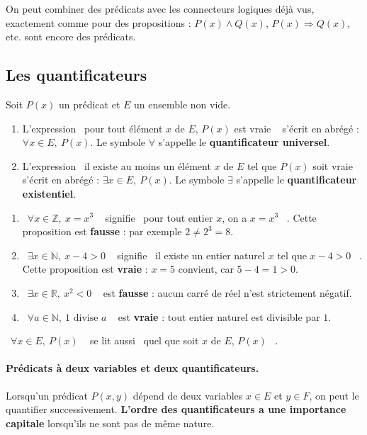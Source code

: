 \documentclass[a4paper,12pt,openany]{book}
\providecommand{\og}{\guillemotleft~}
\providecommand{\fg}{\ifhmode~\fi\guillemotright}
\begin{document}
On peut combiner des prédicats avec les connecteurs logiques déjà vus, exactement
comme pour des propositions : $P(x)\wedge Q(x)$, $P(x)\Rightarrow Q(x)$, etc.
sont encore des prédicats.

\subsection{Les quantificateurs}


\begin{definition}
Soit $P(x)$ un prédicat et $E$ un ensemble non vide.
\begin{enumerate}
  \item L'expression \og pour tout élément $x$ de $E$, $P(x)$ est vraie \fg{}
  s'écrit en abrégé : $\forall x \in E,\ P(x)$. Le symbole $\forall$ s'appelle
  le \textbf{quantificateur universel}.
  \item L'expression \og il existe au moins un élément $x$ de $E$ tel que
  $P(x)$ soit vraie \fg{} s'écrit en abrégé : $\exists x \in E,\ P(x)$. Le
  symbole $\exists$ s'appelle le \textbf{quantificateur existentiel}.
\end{enumerate}
\end{definition}

\begin{exemple}
\begin{enumerate}
  \item \og $\forall x \in \mathbb{Z},\ x = x^3$ \fg{} signifie \og pour tout
  entier $x$, on a $x=x^3$ \fg{}. Cette proposition est \textbf{fausse} : par
  exemple $2 \neq 2^3=8$.
  \item \og $\exists x \in \mathbb{N},\ x-4>0$ \fg{} signifie \og il existe un
  entier naturel $x$ tel que $x-4>0$ \fg. Cette proposition est
  \textbf{vraie} : $x=5$ convient, car $5-4=1>0$.
  \item \og $\exists x \in \mathbb{R},\ x^2<0$ \fg{} est \textbf{fausse} :
  aucun carré de réel n'est strictement négatif.
  \item \og $\forall a \in \mathbb{N},\ 1 \text{ divise } a$ \fg{} est
  \textbf{vraie} : tout entier naturel est divisible par $1$.
\end{enumerate}
\end{exemple}

\begin{remarque}
\og $\forall x \in E,\ P(x)$ \fg{} se lit aussi \og quel que soit $x$ de
$E$, $P(x)$ \fg.
\end{remarque}

\paragraph{Prédicats à deux variables et deux quantificateurs.}
Lorsqu'un prédicat $P(x,y)$ dépend de deux variables $x\in E$ et $y\in F$, on
peut le quantifier successivement. \textbf{L'ordre des quantificateurs a une
importance capitale} lorsqu'ils ne sont pas de même nature.
\end{document}
